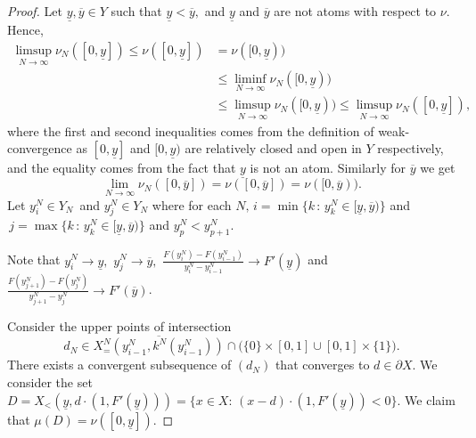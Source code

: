 \documentclass[12pt,reqno]{amsart}
\begin{document}
\begin{proof}
    Let $\underline{y},\overline{y}\in Y$ such that $\underline{y}<
\overline{y},$ and $\underline{y}$ and $\overline{y}$ are not  atoms with respect to $\nu.$ %
Hence,\[\begin{array}{ll}\limsup_{N\to\infty}\nu_N([0,\underline{y}])\le\nu([0,\underline{y}])&=\nu([0,\underline{y}))\\
&\le\liminf_{N\to \infty}\nu_N([0,\underline{y}))\\
&\le \limsup_{N\to \infty}\nu_N([0,\underline{y}))\le\limsup_{N\to\infty}\nu_N([0,\underline{y}]),
\end{array}\]
    where the first and second inequalities comes from the definition of weak-convergence as $[0,\underline{y}]$ and $[0,\underline{y})$ are relatively closed and open in $Y$ respectively, and the equality comes from the fact that $\underline{y}$ is not an atom. Similarly for $\overline{y}$ we get 
\[\lim_{N\to\infty}\nu_N([0,\overline{y}])=\nu([0,\overline{y}])=\nu([0,\overline{y})).\]
    Let  $y_i^N\in Y_N\,$ and $y_j^N\in Y_N$  where for each $N,\,  i=\min\{k\,:\,y_k^N\in[\underline{y},\overline{y}) \}$ and $\,j=\max\{k\,:\,y_k^N\in[\underline{y},\overline{y}) \}$ and $y^N_p<y^N_{p+1}.$     

Note that $y_i^N\to \underline{y},$  $y_j^N \to \overline{y},$  $\frac{F(y_{i}^N)-F(y_{i-1}^N)}{y_{i}^N-y_{i-1}^N}\to F'(\underline{y})$ and $\frac{F(y_{j+1}^N)-F(y_j^N)}{y_{j+1}^N-y_j^N}\to F'(\overline{y})$. 

\hspace{-6pt}Consider the upper points of intersection 
\[d_N\in \overline{X_=^N(y_{i-1}^N,k^N(y_{i-1}^N))}\cap \big(\{0\} \times [0,1] \cup[0,1] \times \{1\}\big).\] There exists a convergent subsequence of $(d_N)$ that converges to $d\in\partial X.$ We consider the set $D=X_<(\underline{y},d\cdot(1,F'(\underline{y})))=\Big\{x\in X:\, (x-d)\cdot(1,F'(\underline{y}))<0\Big\}.$ We  claim that $\mu(D)=\nu([0,\underline{y}]).$ 


\end{proof}
\end{document}
